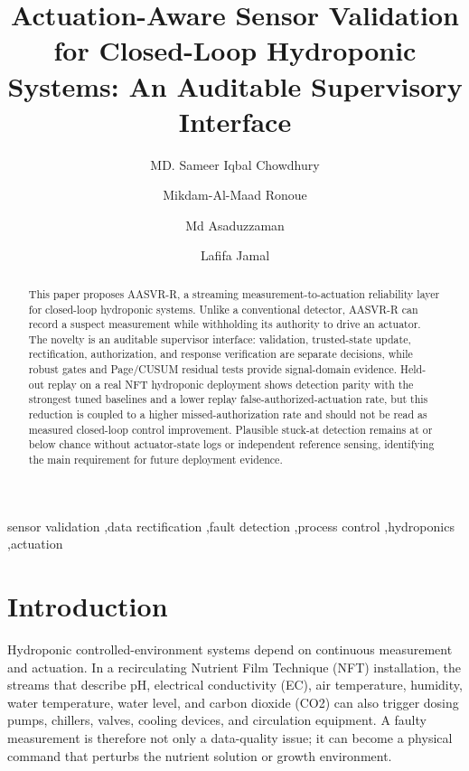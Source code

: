 \documentclass[preprint,12pt,doubleblind]{elsarticle}
\begin{document}
\begin{frontmatter}

\title{Actuation-Aware Sensor Validation for Closed-Loop Hydroponic Systems: An Auditable Supervisory Interface}

\ifdefined\AASVRBLINDED
\else
\author[du]{MD. Sameer Iqbal Chowdhury}
\author[du]{Mikdam-Al-Maad Ronoue}
\author[kuas]{Md Asaduzzaman}
\author[du]{Lafifa Jamal}
\fi

\begin{abstract}
This paper proposes AASVR-R, a streaming measurement-to-actuation reliability layer for closed-loop hydroponic systems. Unlike a conventional detector, AASVR-R can record a suspect measurement while withholding its authority to drive an actuator. The novelty is an auditable supervisor interface: validation, trusted-state update, rectification, authorization, and response verification are separate decisions, while robust gates and Page/CUSUM residual tests provide signal-domain evidence. Held-out replay on a real NFT hydroponic deployment shows detection parity with the strongest tuned baselines and a lower replay false-authorized-actuation rate, but this reduction is coupled to a higher missed-authorization rate and should not be read as measured closed-loop control improvement. Plausible stuck-at detection remains at or below chance without actuator-state logs or independent reference sensing, identifying the main requirement for future deployment evidence.
\end{abstract}

\begin{keyword}
sensor validation \sep data rectification \sep fault detection \sep process control \sep hydroponics \sep actuation
\end{keyword}

\end{frontmatter}

\section{Introduction}
Hydroponic controlled-environment systems depend on continuous measurement and actuation. In a recirculating Nutrient Film Technique (NFT) installation, the streams that describe pH, electrical conductivity (EC), air temperature, humidity, water temperature, water level, and carbon dioxide (CO2) can also trigger dosing pumps, chillers, valves, cooling devices, and circulation equipment. A faulty measurement is therefore not only a data-quality issue; it can become a physical command that perturbs the nutrient solution or growth environment.
\end{document}
